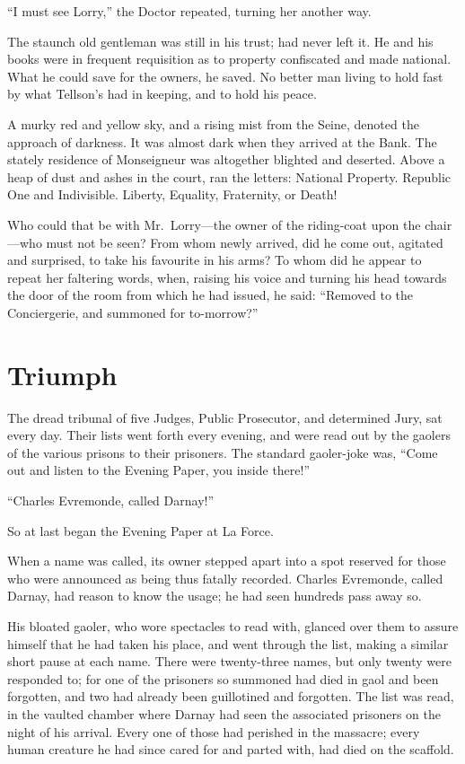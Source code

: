 ``I must see Lorry,'' the Doctor repeated, turning her another way.

The staunch old gentleman was still in his trust; had never left it.
He and his books were in frequent requisition as to property
confiscated and made national.  What he could save for the owners, he
saved.  No better man living to hold fast by what Tellson's had in
keeping, and to hold his peace.

A murky red and yellow sky, and a rising mist from the Seine, denoted
the approach of darkness.  It was almost dark when they arrived at
the Bank.  The stately residence of Monseigneur was altogether
blighted and deserted.  Above a heap of dust and ashes in the court,
ran the letters:  National Property.  Republic One and Indivisible.
Liberty, Equality, Fraternity, or Death!

Who could that be with Mr.\ Lorry---the owner of the riding-coat upon
the chair---who must not be seen?  From whom newly arrived, did he come
out, agitated and surprised, to take his favourite in his arms?  To
whom did he appear to repeat her faltering words, when, raising his
voice and turning his head towards the door of the room from which he
had issued, he said:  ``Removed to the Conciergerie, and summoned for
to-morrow?''



\chapter{Triumph}


The dread tribunal of five Judges, Public Prosecutor, and determined
Jury, sat every day.  Their lists went forth every evening, and were
read out by the gaolers of the various prisons to their prisoners.
The standard gaoler-joke was, ``Come out and listen to the Evening Paper,
you inside there!''

``Charles Evremonde, called Darnay!''

So at last began the Evening Paper at La Force.

When a name was called, its owner stepped apart into a spot reserved
for those who were announced as being thus fatally recorded.  Charles
Evremonde, called Darnay, had reason to know the usage; he had seen
hundreds pass away so.

His bloated gaoler, who wore spectacles to read with, glanced over
them to assure himself that he had taken his place, and went through
the list, making a similar short pause at each name.  There were
twenty-three names, but only twenty were responded to; for one of the
prisoners so summoned had died in gaol and been forgotten, and two
had already been guillotined and forgotten.  The list was read, in
the vaulted chamber where Darnay had seen the associated prisoners on
the night of his arrival.  Every one of those had perished in the
massacre; every human creature he had since cared for and parted with,
had died on the scaffold.

